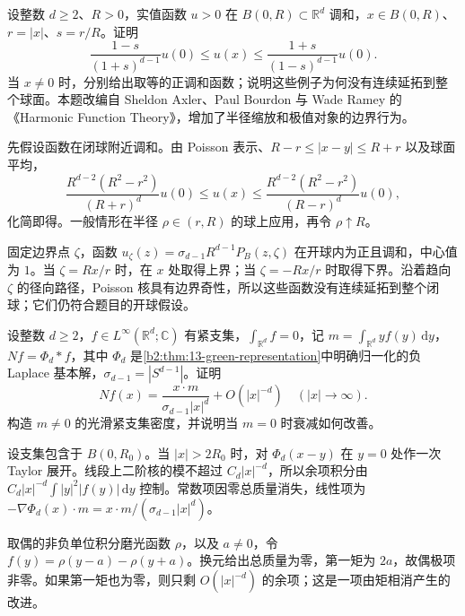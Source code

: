 \begin{exercise}\label{b2:ex:13-sharp-harnack}
设整数 \(d\geq2\)、\(R>0\)，实值函数 \(u>0\) 在 \(B(0,R)\subset\mathbb R^d\) 调和，\(x\in B(0,R)\)、\(r=|x|\)、\(s=r/R\)。证明
\[
 \dfrac{1-s}{(1+s)^{d-1}}u(0)
 \leq u(x)\leq
 \dfrac{1+s}{(1-s)^{d-1}}u(0).
\]
当 \(x\ne0\) 时，分别给出取等的正调和函数；说明这些例子为何没有连续延拓到整个球面。本题改编自 Sheldon Axler、Paul Bourdon 与 Wade Ramey 的《Harmonic Function Theory》\cite[Chapter 3, Exercise 2, p.~56]{Axler2001Harmonic}，增加了半径缩放和极值对象的边界行为。
\end{exercise}
\begin{solution}
先假设函数在闭球附近调和。由 Poisson 表示、\(R-r\leq|x-y|\leq R+r\) 以及球面平均，
\[
 \dfrac{R^{d-2}(R^2-r^2)}{(R+r)^d}u(0)
 \leq u(x)\leq
 \dfrac{R^{d-2}(R^2-r^2)}{(R-r)^d}u(0),
\]
化简即得。一般情形在半径 \(\rho\in(r,R)\) 的球上应用，再令 \(\rho\uparrow R\)。

固定边界点 \(\zeta\)，函数 \(u_\zeta(z)=\sigma_{d-1}R^{d-1}P_B(z,\zeta)\) 在开球内为正且调和，中心值为 \(1\)。当 \(\zeta=Rx/r\) 时，在 \(x\) 处取得上界；当 \(\zeta=-Rx/r\) 时取得下界。沿着趋向 \(\zeta\) 的径向路径，Poisson 核具有边界奇性，所以这些函数没有连续延拓到整个闭球；它们仍符合题目的开球假设。
\end{solution}

\begin{exercise}\label{b2:ex:13-dipole}
设整数 \(d\geq2\)，\(f\in L^\infty(\mathbb R^d;\mathbb C)\) 有紧支集，\(\int_{\mathbb R^d} f=0\)，记 \(m=\int_{\mathbb R^d}y f(y)\,\mathrm{d}y\)，\(Nf=\Phi_d*f\)，其中 \(\Phi_d\) 是\cref{b2:thm:13-green-representation}中明确归一化的负 Laplace 基本解，\(\sigma_{d-1}=|S^{d-1}|\)。证明
\[
 Nf(x)=\dfrac{x\cdot m}{\sigma_{d-1}|x|^d}+O(|x|^{-d})
 \quad(|x|\to\infty).
\]
构造 \(m\ne0\) 的光滑紧支集密度，并说明当 \(m=0\) 时衰减如何改善。
\end{exercise}
\begin{solution}
设支集包含于 \(B(0,R_0)\)。当 \(|x|>2R_0\) 时，对 \(\Phi_d(x-y)\) 在 \(y=0\) 处作一次 Taylor 展开。线段上二阶核的模不超过 \(C_d|x|^{-d}\)，所以余项积分由 \(C_d|x|^{-d}\int|y|^2|f(y)|\,\mathrm{d}y\) 控制。常数项因零总质量消失，线性项为 \(-\nabla\Phi_d(x)\cdot m=x\cdot m/(\sigma_{d-1}|x|^d)\)。

取偶的非负单位积分磨光函数 \(\rho\)，以及 \(a\ne0\)，令 \(f(y)=\rho(y-a)-\rho(y+a)\)。换元给出总质量为零，第一矩为 \(2a\)，故偶极项非零。如果第一矩也为零，则只剩 \(O(|x|^{-d})\) 的余项；这是一项由矩相消产生的改进。
\end{solution}

